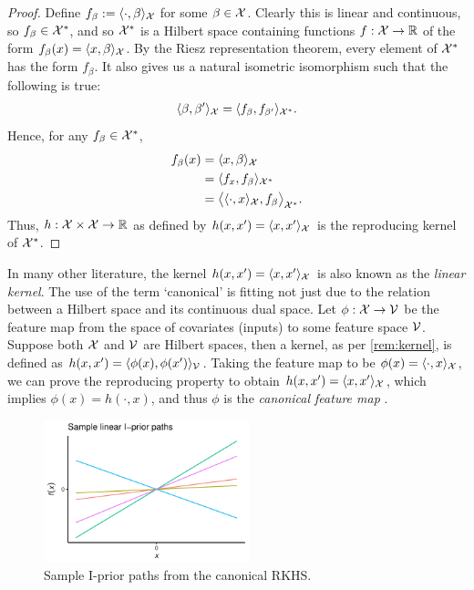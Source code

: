 \begin{proof}
  Define $f_\beta := \langle\cdot,\beta\rangle_{\mathcal X}$ for some $\beta \in {\mathcal X}$.
  Clearly this is linear and continuous, so $f_\beta\in{\mathcal X}^*$, and so ${\mathcal X}^*$ is a Hilbert space containing functions $f:{\mathcal X}\to\mathbb{R}$ of the form $f_\beta(x) = \langle x,\beta\rangle_{\mathcal X}$.
  By the Riesz representation theorem, every element of ${\mathcal X}^*$ has the form $f_\beta$.
  It also gives us a natural isometric isomorphism such that the following is true:
  \[
    \langle\beta,\beta'\rangle_{\mathcal X} = \langle f_\beta,f_{\beta'}\rangle_{{\mathcal X}^*}.
  \]
  Hence, for any $f_\beta\in{\mathcal X}^*$, 
  \vspace{-0.5em}
  \begin{align*}
    f_\beta(x) 
    &= \ip{x,\beta}_\cX \\
    &= \ip{f_x,f_{\beta}}_{\cX^*} \\
    &= \big\langle \ip{\cdot,x}_\cX,f_{\beta} \big\rangle_{\cX^*}. \vspace{-0.5em}
  \end{align*}
  Thus, $h:{\mathcal X}\times{\mathcal X}\to\mathbb{R}$ as defined by $h(x,x') = \langle x,x'\rangle_{\mathcal X}$ is the reproducing kernel of ${\mathcal X}^*$.
\end{proof}

In many other literature, the kernel $h(x,x') = \langle x,x'\rangle_{\mathcal X}$ is also known as the \emph{linear kernel}.
The use of the term `canonical' is fitting not just due to the relation between a Hilbert space and its continuous dual space.
Let $\phi:{\mathcal X}\to{\mathcal V}$ be the feature map from the space of covariates (inputs) to some feature space ${\mathcal V}$.
Suppose both ${\mathcal X}$ and ${\mathcal V}$ are Hilbert spaces, then a kernel, as per \cref{rem:kernel}, is defined as $h(x,x') = \langle\phi(x),\phi(x')\rangle_{\mathcal V}$.
Taking the feature map to be $\phi(x) = \langle\cdot,x\rangle_{\mathcal X}$, we can prove the reproducing property to obtain $h(x,x') = \langle x,x'\rangle_{\mathcal X}$, which implies $\phi(x) = h(\cdot,x)$, and thus $\phi$ is the \emph{canonical feature map} \citep[Lemma 4.19]{steinwart2008support}.

\begin{figure}[H]
  \centering
  \includegraphics[width=0.53\textwidth]{figure/02-kernel_path_canonical}
  \caption{Sample I-prior paths from the canonical RKHS.}
\end{figure}

